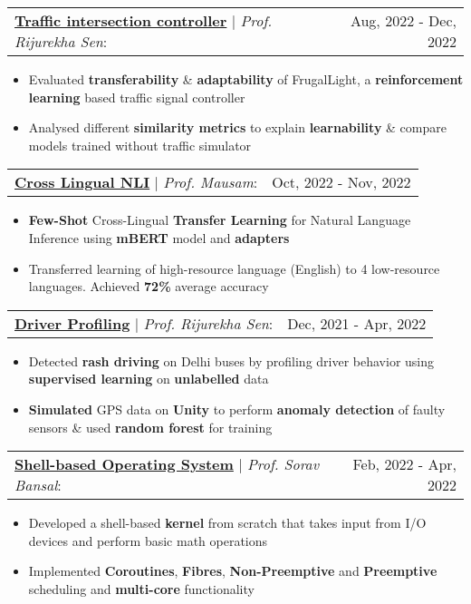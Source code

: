 \documentclass[letterpaper,11pt]{article}
\makeatletter
\newcommand{\resumeItem}[1]{
  \item\small{
    {#1 \vspace{-2pt}}
  }
}
\newcommand{\headingStart}{
  \begin{tabular*}{0.97\textwidth}[t]{l@{\extracolsep{\fill}}r}
}
\newcommand{\projectHeading}[3]{
    \item
    \headingStart
      \underline{\textbf{#1}} $|$ \textit{#2}: & #3 \\
    \end{tabular*}\vspace{-7pt}
}
\newcommand{\itemListStart}[1]
  {\begin{itemize}[leftmargin=#1in, rightmargin=0in]}
\newcommand{\itemListEnd}{\end{itemize}\vspace{-5pt}}
\makeatother
\begin{document}
      \projectHeading
        {Traffic intersection controller}
        {Prof. Rijurekha Sen}
        {Aug, 2022 - Dec, 2022}
        \itemListStart{0.2}
          \resumeItem{Evaluated \textbf{transferability} \& \textbf{adaptability} of FrugalLight, a \textbf{reinforcement learning} based traffic signal controller}
          \resumeItem{Analysed different \textbf{similarity metrics} to explain \textbf{learnability} \& compare models trained without traffic simulator}
        \itemListEnd
      
      \projectHeading
        {Cross Lingual NLI}
        {Prof. Mausam}
        {Oct, 2022 - Nov, 2022}
        \itemListStart{0.2}
          \resumeItem{\textbf{Few-Shot} Cross-Lingual \textbf{Transfer Learning} for Natural Language Inference using \textbf{mBERT} model and \textbf{adapters}}
          \resumeItem{Transferred learning of high-resource language (English) to 4 low-resource languages. Achieved \textbf{72\%} average accuracy}
        \itemListEnd


      \projectHeading
        {Driver Profiling}
        {Prof. Rijurekha Sen}
        {Dec, 2021 - Apr, 2022}
        \itemListStart{0.2}
          \resumeItem{Detected \textbf{rash driving} on Delhi buses by profiling driver behavior using \textbf{supervised learning} on \textbf{unlabelled} data}
          \resumeItem{\textbf{Simulated} GPS data on \textbf{Unity} to perform \textbf{anomaly detection} of faulty sensors \& used \textbf{random forest} for training}
        \itemListEnd


      \projectHeading
        {Shell-based Operating System}
        {Prof. Sorav Bansal}
        {Feb, 2022 - Apr, 2022}
        \itemListStart{0.2}
          \resumeItem{Developed a shell-based \textbf{kernel} from scratch that takes input from I/O devices and perform basic math operations}
          \resumeItem{Implemented \textbf{Coroutines}, \textbf{Fibres}, \textbf{Non-Preemptive} and \textbf{Preemptive} scheduling and \textbf{multi-core} functionality}
        \itemListEnd

\end{document}
